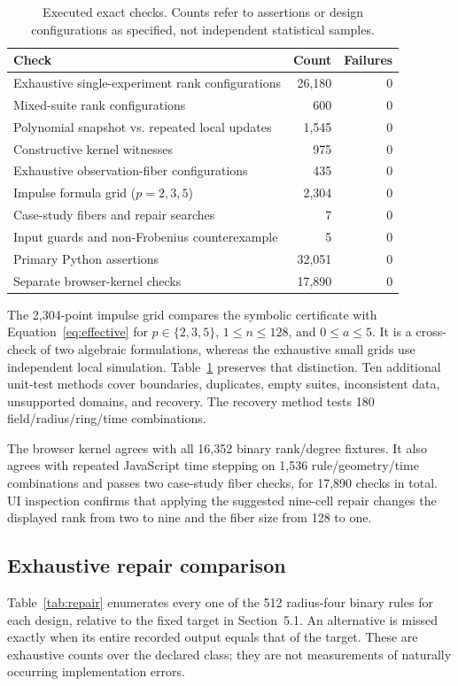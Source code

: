 \documentclass{ijuc}
\begin{document}
\begin{table}[t]
\centering\small
\caption{Executed exact checks. Counts refer to assertions or design configurations as specified, not independent statistical samples.}
\label{tab:checks}
\begin{tabular}{@{}p{.62\linewidth}rr@{}}
\toprule
Check & Count & Failures\\\midrule
Exhaustive single-experiment rank configurations & 26,180 & 0\\
Mixed-suite rank configurations & 600 & 0\\
Polynomial snapshot vs. repeated local updates & 1,545 & 0\\
Constructive kernel witnesses & 975 & 0\\
Exhaustive observation-fiber configurations & 435 & 0\\
Impulse formula grid ($p=2,3,5$) & 2,304 & 0\\
Case-study fibers and repair searches & 7 & 0\\
Input guards and non-Frobenius counterexample & 5 & 0\\\midrule
Primary Python assertions & 32,051 & 0\\
Separate browser-kernel checks & 17,890 & 0\\\bottomrule
\end{tabular}
\end{table}

The 2,304-point impulse grid compares the symbolic certificate with Equation~\eqref{eq:effective} for $p\in\{2,3,5\}$, $1\leq n\leq128$, and $0\leq a\leq5$. It is a cross-check of two algebraic formulations, whereas the exhaustive small grids use independent local simulation. Table~\ref{tab:checks} preserves that distinction. Ten additional unit-test methods cover boundaries, duplicates, empty suites, inconsistent data, unsupported domains, and recovery. The recovery method tests 180 field/radius/ring/time combinations.

The browser kernel agrees with all 16,352 binary rank/degree fixtures. It also agrees with repeated JavaScript time stepping on 1,536 rule/geometry/time combinations and passes two case-study fiber checks, for 17,890 checks in total. UI inspection confirms that applying the suggested nine-cell repair changes the displayed rank from two to nine and the fiber size from 128 to one.

\subsection{Exhaustive repair comparison}
Table~\ref{tab:repair} enumerates every one of the 512 radius-four binary rules for each design, relative to the fixed target in Section~5.1. An alternative is missed exactly when its entire recorded output equals that of the target. These are exhaustive counts over the declared class; they are not measurements of naturally occurring implementation errors.
\end{document}
